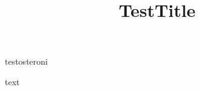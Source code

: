 \documentclass[%
    debug/frame=false,
    landscape,
    title option=ultra compact,
    colors/section/fg=AA0000,
    ]{ostsummary}
\title{TestTitle}
\begin{document}
\makeatletter
\@title
\@lecturer
\makeatother
testosteroni %

\textcolor{sectionfg}{text}
\end{document}
